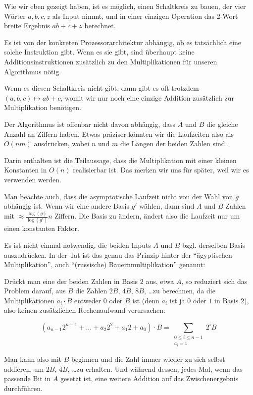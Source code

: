 \begin{remark}
    Wie wir eben gezeigt haben, ist es möglich, einen Schaltkreis zu bauen, der vier Wörter $a,b,c,z$ als Input nimmt, und in einer einzigen Operation das 2-Wort breite Ergebnis $ab+c+z$ berechnet.
    
    \smallskip
    Es ist von der konkreten Prozessorarchitektur abhängig, ob es tatsächlich eine solche Instruktion gibt. Wenn es sie gibt, sind überhaupt keine Additionsinstruktionen zusätzlich zu den Multiplikationen für unseren Algorithmus nötig.
    
    \smallskip
    Wenn es diesen Schaltkreis nicht gibt, dann gibt es oft trotzdem $(a,b,c)\mapsto ab+c$, womit wir nur noch eine einzige Addition zusätzlich zur Multiplikation benötigen.
\end{remark}

\begin{remark}
    Der Algorithmus ist offenbar nicht davon abhängig, dass $A$ und $B$ die gleiche Anzahl an Ziffern haben. Etwas präziser könnten wir die Laufzeiten also als $O(nm)$ ausdrücken, wobei $n$ und $m$ die Längen der beiden Zahlen sind.
    
    \smallskip
    Darin enthalten ist die Teilaussage, dass die Multiplikation mit einer kleinen Konstanten in $O(n)$ realisierbar ist. Das merken wir uns für später, weil wir es verwenden werden.
\end{remark}

\begin{remark}
    Man beachte auch, dass die asymptotische Laufzeit nicht von der Wahl von $g$ abhängig ist. Wenn wir eine andere Basis $g'$ wählen, dann sind $A$ und $B$ Zahlen mit $\approx \frac{\log(g)}{\log(g')}n$ Ziffern. Die Basis zu ändern, ändert also die Laufzeit nur um einen konstanten Faktor.
\end{remark}


\begin{remark}
    Es ist nicht einmal notwendig, die beiden Inputs $A$ und $B$ bzgl. derselben Basis auszudrücken. In der Tat ist das genau das Prinzip hinter der \enquote{ägyptischen Multiplikation}, auch \enquote{(russische) Bauernmultiplikation} genannt:

    Drückt man eine der beiden Zahlen in Basis $2$ aus, etwa $A$, so reduziert sich das Problem darauf, aus $B$ die Zahlen $2B$, $4B$, $8B$, \ldots zu berechnen, da die Multiplikationen $a_i\cdot B$ entweder $0$ oder $B$ ist (denn $a_i$ ist ja $0$ oder $1$ in Basis $2$), also keinen zusätzlichen Rechenaufwand verursachen:

    \[(a_{n-1} 2^{n-1} + \ldots + a_2 2^2 + a_1 2 + a_0) \cdot B = \sum_{\substack{0\leq i\leq n-1 \\ a_i = 1}} 2^i B\]

    Man kann also mit $B$ beginnen und die Zahl immer wieder zu sich selbst addieren, um $2B$, $4B$, \ldots zu erhalten. Und während dessen, jedes Mal, wenn das passende Bit in $A$ gesetzt ist, eine weitere Addition auf das Zwischenergebnis durchführen.
\end{remark}

